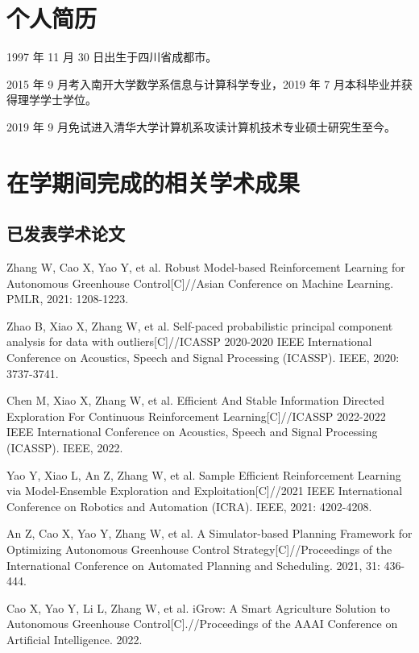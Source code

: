 
\begin{resume}

  \section*{个人简历}

  1997 年 11 月 30 日出生于四川省成都市。

  2015 年 9 月考入南开大学数学系信息与计算科学专业，2019 年 7 月本科毕业并获得理学学士学位。

  2019 年 9 月免试进入清华大学计算机系攻读计算机技术专业硕士研究生至今。


  \section*{在学期间完成的相关学术成果}

  \subsection*{已发表学术论文}

  \begin{achievements}
    \item Zhang W, Cao X, Yao Y, et al. Robust Model-based Reinforcement Learning for Autonomous Greenhouse Control[C]//Asian Conference on Machine Learning. PMLR, 2021: 1208-1223.
    \item Zhao B, Xiao X, Zhang W, et al. Self-paced probabilistic principal component analysis for data with outliers[C]//ICASSP 2020-2020 IEEE International Conference on Acoustics, Speech and Signal Processing (ICASSP). IEEE, 2020: 3737-3741.
    \item Chen M, Xiao X, Zhang W, et al. Efficient And Stable Information Directed Exploration For Continuous Reinforcement Learning[C]//ICASSP 2022-2022 IEEE International Conference on Acoustics, Speech and Signal Processing (ICASSP). IEEE, 2022.
    \item Yao Y, Xiao L, An Z, Zhang W, et al. Sample Efficient Reinforcement Learning via Model-Ensemble Exploration and Exploitation[C]//2021 IEEE International Conference on Robotics and Automation (ICRA). IEEE, 2021: 4202-4208.
    \item An Z, Cao X, Yao Y, Zhang W, et al. A Simulator-based Planning Framework for Optimizing Autonomous Greenhouse Control Strategy[C]//Proceedings of the International Conference on Automated Planning and Scheduling. 2021, 31: 436-444.
    \item Cao X, Yao Y, Li L, Zhang W, et al. iGrow: A Smart Agriculture Solution to Autonomous Greenhouse Control[C].//Proceedings of the AAAI Conference on Artificial Intelligence. 2022.
  \end{achievements}
  

\end{resume}
